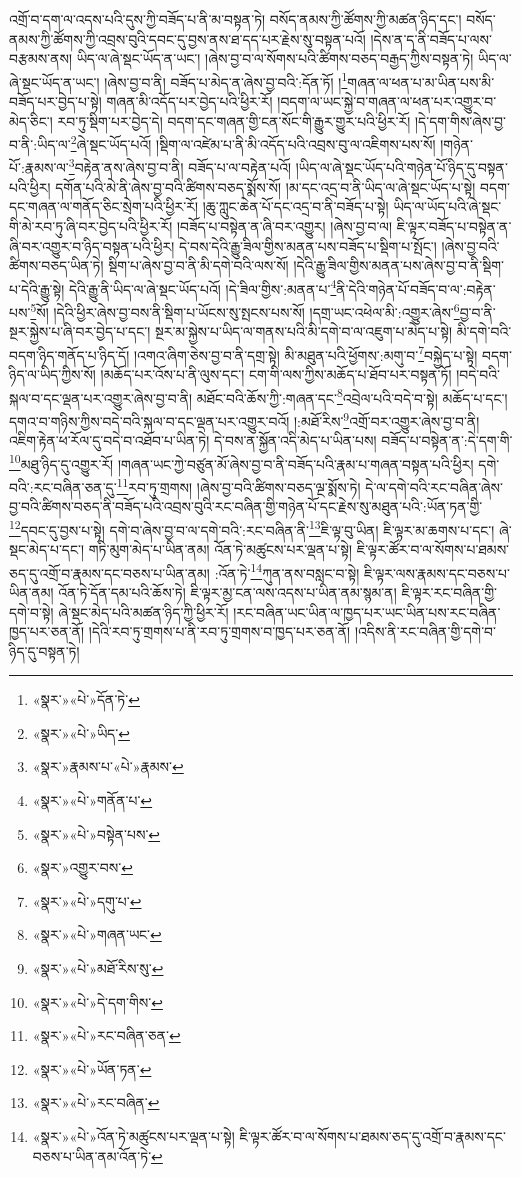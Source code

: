 འགྲོ་བ་དག་ལ་འདས་པའི་དུས་ཀྱི་བཟོད་པ་ནི་མ་བསྟན་ཏེ། བསོད་ནམས་ཀྱི་ཚོགས་ཀྱི་མཚན་ཉིད་དང་། བསོད་ནམས་ཀྱི་ཚོགས་ཀྱི་འབྲས་བུའི་དབང་དུ་བྱས་ནས་ཐ་དད་པར་རྗེས་སུ་བསྟན་པའོ། །དེས་ན་ད་ནི་བཟོད་པ་ལས་བརྩམས་ནས། ཡིད་ལ་ཞེ་སྡང་ཡོད་ན་ཡང་། །ཞེས་བྱ་བ་ལ་སོགས་པའི་ཚིགས་བཅད་བརྒྱད་ཀྱིས་བསྟན་ཏེ། ཡིད་ལ་ཞེ་སྡང་ཡོད་ན་ཡང་། །ཞེས་བྱ་བ་ནི། བཟོད་པ་མེད་ན་ཞེས་བྱ་བའི་:དོན་ཏོ། །\footnote{«སྣར་»«པེ་»དོན་ཏེ་}གཞན་ལ་ཕན་པ་མ་ཡིན་པས་མི་བཟོད་པར་བྱེད་པ་སྟེ། གཞན་མི་འདོད་པར་བྱེད་པའི་ཕྱིར་རོ། །བདག་ལ་ཡང་སྐྱེ་བ་གཞན་ལ་ཕན་པར་འགྱུར་བ་མེད་ཅིང་། རབ་ཏུ་སྡིག་པར་བྱེད་དེ། བདག་དང་གཞན་གྱི་ངན་སོང་གི་རྒྱུར་གྱུར་པའི་ཕྱིར་རོ། །དེ་དག་གིས་ཞེས་བྱ་བ་ནི་:ཡིད་ལ་\footnote{«སྣར་»«པེ་»ཡིད་}ཞེ་སྡང་ཡོད་པའོ། །སྡིག་ལ་འཛེམ་པ་ནི་མི་འདོད་པའི་འབྲས་བུ་ལ་འཇིགས་པས་སོ། །གཉེན་པོ་:རྣམས་ལ་\footnote{«སྣར་»རྣམས་པ་«པེ་»རྣམས་}བརྟེན་ནས་ཞེས་བྱ་བ་ནི། བཟོད་པ་ལ་བརྟེན་པའོ། །ཡིད་ལ་ཞེ་སྡང་ཡོད་པའི་གཉེན་པོ་ཉིད་དུ་བསྟན་པའི་ཕྱིར། དགོན་པའི་མེ་ནི་ཞེས་བྱ་བའི་ཚིགས་བཅད་སྨོས་སོ། །མ་དང་འདྲ་བ་ནི་ཡིད་ལ་ཞེ་སྡང་ཡོད་པ་སྟེ། བདག་དང་གཞན་ལ་གནོད་ཅིང་སྲེག་པའི་ཕྱིར་རོ། །ཆུ་ཀླུང་ཆེན་པོ་དང་འདྲ་བ་ནི་བཟོད་པ་སྟེ། ཡིད་ལ་ཡོད་པའི་ཞེ་སྡང་གི་མེ་རབ་ཏུ་ཞི་བར་བྱེད་པའི་ཕྱིར་རོ། །བཟོད་པ་བསྟེན་ན་ཞི་བར་འགྱུར། །ཞེས་བྱ་བ་ལ། ཇི་ལྟར་བཟོད་པ་བསྟེན་ན་ཞི་བར་འགྱུར་བ་ཉིད་བསྟན་པའི་ཕྱིར། དེ་བས་དེའི་རྒྱུ་ཟིལ་གྱིས་མནན་པས་བཟོད་པ་སྡིག་པ་སྤོང་། །ཞེས་བྱ་བའི་ཚིགས་བཅད་ཡིན་ཏེ། སྡིག་པ་ཞེས་བྱ་བ་ནི་མི་དགེ་བའི་ལས་སོ། །དེའི་རྒྱུ་ཟིལ་གྱིས་མནན་པས་ཞེས་བྱ་བ་ནི་སྡིག་པ་དེའི་རྒྱུ་སྟེ། དེའི་རྒྱུ་ནི་ཡིད་ལ་ཞེ་སྡང་ཡོད་པའོ། །དེ་ཟིལ་གྱིས་:མནན་པ་\footnote{«སྣར་»«པེ་»གནོན་པ་}ནི་དེའི་གཉེན་པོ་བཟོད་བ་ལ་:བརྟེན་པས་\footnote{«སྣར་»«པེ་»བསྟེན་པས་}སོ། །དེའི་ཕྱིར་ཞེས་བྱ་བས་ནི་སྡིག་པ་ཡོངས་སུ་སྤངས་པས་སོ། །དགྲ་ཡང་འཕེལ་མི་:འགྱུར་ཞེས་\footnote{«སྣར་»འགྱུར་བས་}བྱ་བ་ནི་སྔར་སྐྱེས་པ་ཞི་བར་བྱེད་པ་དང་། སྔར་མ་སྐྱེས་པ་ཡིད་ལ་གནས་པའི་མི་དགེ་བ་ལ་འཇུག་པ་མེད་པ་སྟེ། མི་དགེ་བའི་བདག་ཉིད་གནོད་པ་ཉིད་དོ། །འགའ་ཞིག་ཅེས་བྱ་བ་ནི་དགྲ་སྟེ། མི་མཐུན་པའི་ཕྱོགས་:མགུ་བ་\footnote{«སྣར་»«པེ་»དགུ་པ་}བསྐྱེད་པ་སྟེ། བདག་ཉིད་ལ་ཡིད་ཀྱིས་སོ། །མཆོད་པར་འོས་པ་ནི་ལུས་དང་། ངག་གི་ལས་ཀྱིས་མཆོད་པ་ཐོབ་པར་བསྟན་ཏོ། །བདེ་བའི་སྐལ་བ་དང་ལྡན་པར་འགྱུར་ཞེས་བྱ་བ་ནི། མཐོང་བའི་ཆོས་ཀྱི་:གཞན་དང་\footnote{«སྣར་»«པེ་»གཞན་ཡང་}འབྲེལ་པའི་བདེ་བ་སྟེ། མཆོད་པ་དང་། དགའ་བ་གཉིས་ཀྱིས་བདེ་བའི་སྐལ་བ་དང་ལྡན་པར་འགྱུར་བའོ། །:མཐོ་རིས་\footnote{«སྣར་»«པེ་»མཐོ་རིས་སུ་}འགྲོ་བར་འགྱུར་ཞེས་བྱ་བ་ནི། འཇིག་རྟེན་ཕ་རོལ་དུ་བདེ་བ་འཐོབ་པ་ཡིན་ཏེ། དེ་བས་ན་སྐྱོན་འདི་མེད་པ་ཡིན་པས། བཟོད་པ་བསྟེན་ན་:དེ་དག་གི་\footnote{«སྣར་»«པེ་»དེ་དག་གིས་}མཐུ་ཉིད་དུ་འགྱུར་རོ། །གཞན་ཡང་ཀྱེ་བཙུན་མོ་ཞེས་བྱ་བ་ནི་བཟོད་པའི་རྣམ་པ་གཞན་བསྟན་པའི་ཕྱིར། དགེ་བའི་:རང་བཞིན་ཅན་དུ་\footnote{«སྣར་»«པེ་»རང་བཞིན་ཅན་}རབ་ཏུ་གྲགས། །ཞེས་བྱ་བའི་ཚིགས་བཅད་ལྔ་སྨོས་ཏེ། དེ་ལ་དགེ་བའི་རང་བཞིན་ཞེས་བྱ་བའི་ཚིགས་བཅད་ནི་བཟོད་པའི་འབྲས་བུའི་རང་བཞིན་གྱི་གཉེན་པོ་དང་རྗེས་སུ་མཐུན་པའི་:ཡོན་ཏན་གྱི་\footnote{«སྣར་»«པེ་»ཡོན་ཏན་}དབང་དུ་བྱས་པ་སྟེ། དགེ་བ་ཞེས་བྱ་བ་ལ་དགེ་བའི་:རང་བཞིན་ནི་\footnote{«སྣར་»«པེ་»རང་བཞིན་}ཇི་ལྟ་བུ་ཡིན། ཇི་ལྟར་མ་ཆགས་པ་དང་། ཞེ་སྡང་མེད་པ་དང་། གཏི་མུག་མེད་པ་ཡིན་ནམ། འོན་ཏེ་མཚུངས་པར་ལྡན་པ་སྟེ། ཇི་ལྟར་ཚོར་བ་ལ་སོགས་པ་ཐམས་ཅད་དུ་འགྲོ་བ་རྣམས་དང་བཅས་པ་ཡིན་ནམ། :འོན་ཏེ་\footnote{«སྣར་»«པེ་»འོན་ཏེ་མཚུངས་པར་ལྡན་པ་སྟེ། ཇི་ལྟར་ཚོར་བ་ལ་སོགས་པ་ཐམས་ཅད་དུ་འགྲོ་བ་རྣམས་དང་བཅས་པ་ཡིན་ནམ་འོན་ཏེ་}ཀུན་ནས་བསླང་བ་སྟེ། ཇི་ལྟར་ལས་རྣམས་དང་བཅས་པ་ཡིན་ནམ། འོན་ཏེ་དོན་དམ་པའི་ཆོས་ཏེ། ཇི་ལྟར་མྱ་ངན་ལས་འདས་པ་ཡིན་ནམ་སྙམ་ན། ཇི་ལྟར་རང་བཞིན་གྱི་དགེ་བ་སྟེ། ཞེ་སྡང་མེད་པའི་མཚན་ཉིད་ཀྱི་ཕྱིར་རོ། །རང་བཞིན་ཡང་ཡིན་ལ་ཁྱད་པར་ཡང་ཡིན་པས་རང་བཞིན་ཁྱད་པར་ཅན་ནོ། །དེའི་རབ་ཏུ་གྲགས་པ་ནི་རབ་ཏུ་གྲགས་བ་ཁྱད་པར་ཅན་ནོ། །འདིས་ནི་རང་བཞིན་གྱི་དགེ་བ་ཉིད་དུ་བསྟན་ཏེ། 